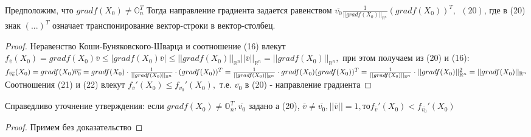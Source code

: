 \begin{assertion}
Предположим, что $grad f(X_0) \neq \mathbb{O}_n^T$ Тогда направление градиента задается равенством $\overline{v_0} \frac{1}{||grad f(X_0)||_{\mathbb{R}^n}}(grad f(X_0))^T, \ \ (20) $, где в (20) знак $(...)^T$ означает транспонирование вектор-строки в вектор-столбец.
\end{assertion}
\begin{proof}
Неравенство Коши-Буняковского-Шварца и соотношение (16) влекут $f_{\overline{v}}(X_0) = grad f(X_0)\overline{v} \leq |grad f(X_0)\overline{v}| \leq ||grad f(X_0)||_{\mathbb{R}^n}||\overline{v}||_{\mathbb{R}^n} = ||grad f(X_0)||_{\mathbb{R}^n},$ при этом получаем из (20) и (16): $f_{\overline{v_0}}(X_0)= grad f(X_0)\overline{v_0} = grad f(X_0)\cdot \frac{1}{||grad f(X_0)||_{\mathbb{R}^n}}\cdot (grad f(X_0))^T = \frac{1}{||grad f(X_0)||_{\mathbb{R}^n}}\cdot grad f(X_0)(grad f(X_0))^T = \frac{1}{||grad f(X_0)||_{\mathbb{R}^n}}\cdot ||grad f(X_0)||^2_{\mathbb{R}^n} = ||grad f(X_0)||_{\mathbb{R}^n} \\$
Соотношения (21) и (22) влекут $f_{\overline{v}}'(X_0) \leq f_{\overline{v_0}}'(X_0),$ т.е. $\overline{v_0}$ в (20) - направление градиента
\end{proof}
\begin{remark}
	Справедливо уточнение утверждения: если $grad f(X_0) \neq \mathbb{O}_n^T, \overline{v_0}$ задано а (20), $\overline{v} \neq \overline{v_0}, ||\overline{v}|| = 1, то f_{\overline{v}}'(X_0) < f_{\overline{v_0}}'(X_0)$
\end{remark}
\begin{proof} Примем без доказательство \end{proof}
